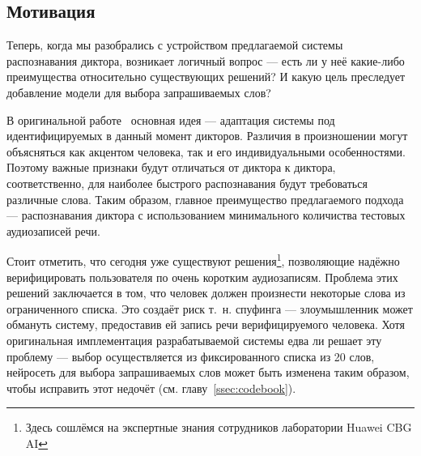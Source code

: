 \subsection{Мотивация}\label{ssec:ytho}

Теперь, когда мы разобрались с устройством предлагаемой системы распознавания
диктора, возникает логичный вопрос --- есть ли у неё какие-либо преимущества
относительно существующих решений? И какую цель преследует добавление модели для
выбора запрашиваемых слов?

В оригинальной работе~\citeisr{} основная идея --- адаптация системы под
идентифицируемых в данный момент дикторов. Различия в произношении могут
объясняться как акцентом человека, так и его индивидуальными особенностями.
Поэтому важные признаки будут отличаться от диктора к диктора, соответственно,
для наиболее быстрого распознавания будут требоваться различные слова. Таким
образом, главное преимущество предлагаемого подхода --- распознавания диктора с
использованием минимального количиства тестовых аудиозаписей речи.

Стоит отметить, что сегодня уже существуют решения\footnote{
    Здесь сошлёмся на экспертные знания сотрудников лаборатории Huawei CBG AI
}, позволяющие надёжно верифицировать пользователя по очень коротким
аудиозаписям. Проблема этих решений заключается в том, что человек должен
произнести некоторые слова из ограниченного списка. Это создаёт риск т.~н.
спуфинга --- злоумышленник может обмануть систему, предоставив ей запись речи
верифицируемого человека. Хотя оригинальная имплементация разрабатываемой
системы едва ли решает эту проблему --- выбор осуществляется из фиксированного
списка из 20 слов, нейросеть для выбора запрашиваемых слов может быть изменена
таким образом, чтобы исправить этот недочёт (см. главу~\ref{ssec:codebook}).
